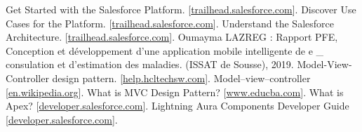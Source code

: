 \documentclass[12pt, oneside, a4paper]{enis-pfe-report}
\begin{document}
  \begin{thebibliography}{9}
Get Started with the Salesforce Platform.
[\href{https://trailhead.salesforce.com/content/learn/modules/starting_force_com/starting_intro}{trailhead.salesforce.com}].
Discover Use Cases for the Platform.
[\href{https://trailhead.salesforce.com/content/learn/modules/starting_force_com/starting_discovering}{trailhead.salesforce.com}].
Understand the Salesforce Architecture.
[\href{https://trailhead.salesforce.com/content/learn/modules/starting_force_com/starting_understanding_arch}{trailhead.salesforce.com}].
Oumayma LAZREG : Rapport PFE, Conception et développement
d'une application mobile
intelligente de e \_ consulation et
d'estimation des maladies.
(ISSAT de Sousse), 2019.
Model-View-Controller design pattern.
[\href{https://help.hcltechsw.com/commerce/9.1.0/developer/concepts/csdmvcdespat.html}{help.hcltechsw.com}].
Model–view–controller
[\href{https://en.wikipedia.org/wiki/Model-view-controller}{en.wikipedia.org}].
What is MVC Design Pattern?
[\href{https://www.educba.com/what-is-mvc-design-pattern/}{www.educba.com}].
What is Apex?
[\href{https://developer.salesforce.com/docs/atlas.en-us.apexcode.meta/apexcode/apex_intro_what_is_apex.htm}{developer.salesforce.com}].
Lightning Aura Components Developer Guide
[\href{https://developer.salesforce.com/docs/atlas.en-us.lightning.meta/lightning/intro_components.htm}{developer.salesforce.com}].





\end{thebibliography}
\end{document}
